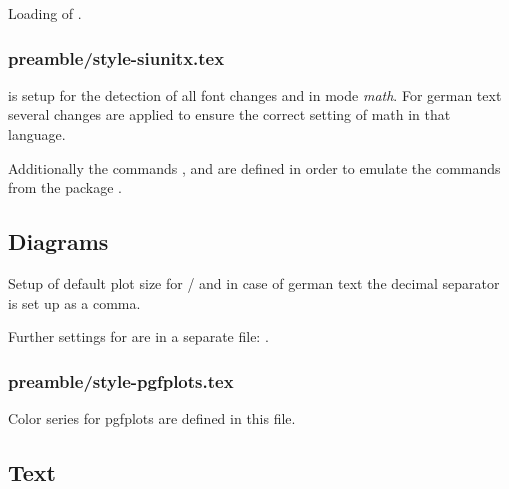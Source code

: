 Loading of .


\subsubsection{preamble/style-siunitx.tex}

 is setup for the detection of all font changes and in mode \emph{math}. For german text several changes are applied to ensure the correct setting of math in that language.

Additionally the commands ,  and  are defined in order to emulate the commands from the package .


\subsection{Diagrams}
\label{sec:style:diagram}

Setup of default plot size for / and in case of german text the decimal separator is set up as a comma.

Further settings for  are in a separate file: 
.


\subsubsection{preamble/style-pgfplots.tex}

Color series for pgfplots are defined in this file.


\subsection{Text}
\label{sec:style:text}

